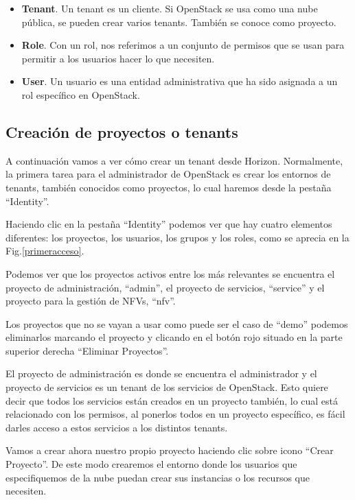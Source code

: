 \begin{itemize}
\item \textbf{Tenant}. Un tenant es un cliente. Si OpenStack se usa como una nube pública, se pueden crear varios tenants. También se conoce como proyecto.
\end{itemize}


\begin{itemize}
\item \textbf{Role}. Con un rol, nos referimos a un conjunto de permisos que se usan para permitir a los usuarios hacer lo que necesiten.
\end{itemize}


\begin{itemize}
\item \textbf{User}. Un usuario es una entidad administrativa que ha sido asignada a un rol específico en OpenStack.
\end{itemize}

\subsection{Creación de proyectos o tenants}
A continuación vamos a ver cómo crear un tenant desde  Horizon. Normalmente, la primera tarea para el administrador de OpenStack es crear los entornos de tenants, también conocidos como  proyectos, lo cual haremos desde la pestaña “Identity”.

Haciendo clic en la pestaña “Identity” podemos ver que hay cuatro elementos diferentes: los proyectos, los usuarios, los grupos y los roles, como se aprecia en la Fig.\ref{primeracceso}.

Podemos ver que los proyectos activos entre los más relevantes se encuentra el proyecto de administración, “admin”, el proyecto de servicios, “service” y el proyecto para la gestión de NFVs, “nfv”.

Los proyectos que no se vayan a usar como puede ser el caso de “demo” podemos eliminarlos marcando el proyecto y clicando en el botón rojo situado en la parte superior derecha “Eliminar Proyectos”.

El proyecto de administración es donde se encuentra el administrador y el proyecto de servicios es un tenant de los servicios de OpenStack. Esto quiere decir que todos los servicios están creados en un proyecto también, lo cual está relacionado con los permisos, al ponerlos todos en un proyecto específico, es fácil darles acceso a estos servicios a los distintos tenants.

Vamos a crear ahora nuestro propio proyecto haciendo clic sobre icono “Crear Proyecto”. De este modo crearemos el entorno donde los usuarios que especifiquemos de la nube puedan crear sus instancias o los recursos que necesiten.

